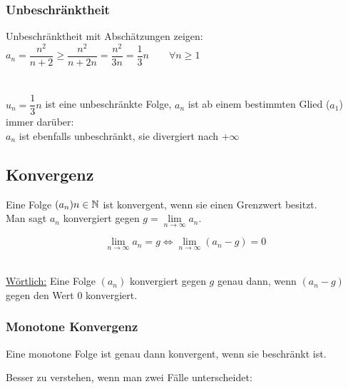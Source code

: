 		\subsubsection{Unbeschränktheit}

\begin{Beispiel}
Unbeschränktheit mit Abschätzungen zeigen:\\
$a_n=\dfrac{n^2}{n+2}\geq\dfrac{n^2}{n+2n}=\dfrac{n^2}{3n}=\dfrac{1}{3}n\qquad\forall n\geq1$\\\\
\\$u_n=\dfrac{1}{3}n$ ist eine unbeschränkte Folge, $a_n$ ist ab einem bestimmten Glied ($a_1$) immer darüber: 
\\$a_n$ ist ebenfalls unbeschränkt, sie divergiert nach $+\infty$
\end{Beispiel}


	\subsection{Konvergenz}

\begin{Definition}
Eine Folge $(a_n)n\in\mathbb{N}$ ist konvergent, wenn sie einen Grenzwert besitzt.\\
Man sagt $a_n$ konvergiert gegen $g=\lim\limits_{n\to\infty}a_n$.
\end{Definition}



\begin{Theorem}

$$\lim\limits_{n\to\infty}a_n=g\Leftrightarrow \lim\limits_{n\to\infty}(a_n-g)=0$$
\end{Theorem}
\\
\underline{Wörtlich:} Eine Folge $(a_n)$ konvergiert gegen $g$ genau dann, wenn $(a_n-g)$ gegen den Wert $0$ konvergiert.
\subsubsection{Monotone Konvergenz}


\begin{Theorem}
Eine monotone Folge ist genau dann konvergent, wenn sie beschränkt ist.
\end{Theorem}

\begin{Beweis}
\end{Beweis}

Besser zu verstehen, wenn man zwei Fälle unterscheidet:

